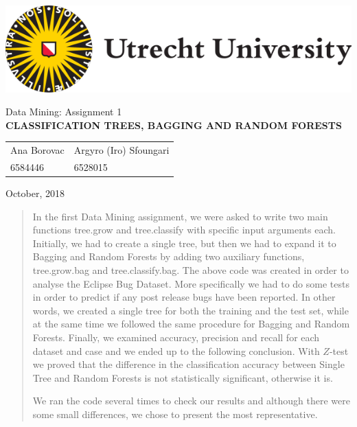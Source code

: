 \documentclass[a4paper,11pt]{article}
\begin{document}
\thispagestyle{empty}

\includegraphics[scale=0.35]{UUlogo.png}

\vspace{50mm}

\begin{center}
\begin{large}
Data Mining: Assignment 1 \\[3mm]
\textbf{
\uppercase{Classification Trees, Bagging and Random Forests}} \\[25mm]
\end{large}

\begin{tabularx}{\textwidth}{YY}
Ana Borovac & Argyro (Iro) Sfoungari \\
6584446 & 6528015
\end{tabularx}
\end{center}

\vfill

October, 2018

\newpage

\tableofcontents

\begin{abstract}
    In the first Data Mining assignment, we were asked to write two main functions tree.grow and tree.classify with specific input arguments each. Initially, we had to create a single tree, but then we had to expand it to Bagging and Random Forests by adding two auxiliary functions, tree.grow.bag and tree.classify.bag. The above code was created in order to analyse the Eclipse Bug Dataset. More specifically we had to do some tests in order to predict if any post release bugs have been reported. In other words, we created a single tree for both the training and the test set, while at the same time we followed the same procedure for Bagging and Random Forests. Finally, we examined accuracy, precision and recall for each dataset and case and we ended up to the following conclusion. With $Z$-test we proved that the difference in the classification accuracy between Single Tree and Random Forests is not statistically significant, otherwise it is. 
    
We ran the code several times to check our results and although there were some small differences, we chose to present the most representative.
\end{abstract}
\end{document}
